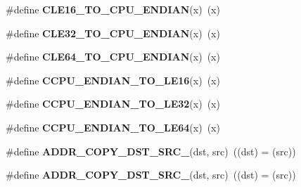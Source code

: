 \begin{DoxyCompactItemize}
\item 
\hypertarget{group__group__sam0__utils_ga4ac6e032d1ce0ae6d2e460da93ce8732}{}\#define {\bfseries C\+L\+E16\+\_\+\+T\+O\+\_\+\+C\+P\+U\+\_\+\+E\+N\+D\+I\+A\+N}(x)~(x)\label{group__group__sam0__utils_ga4ac6e032d1ce0ae6d2e460da93ce8732}

\item 
\hypertarget{group__group__sam0__utils_ga3ff07a7496222efe8bc7d7b7b0342b0d}{}\#define {\bfseries C\+L\+E32\+\_\+\+T\+O\+\_\+\+C\+P\+U\+\_\+\+E\+N\+D\+I\+A\+N}(x)~(x)\label{group__group__sam0__utils_ga3ff07a7496222efe8bc7d7b7b0342b0d}

\item 
\hypertarget{group__group__sam0__utils_gacbbba93256e2d892c748d56a42f00f9b}{}\#define {\bfseries C\+L\+E64\+\_\+\+T\+O\+\_\+\+C\+P\+U\+\_\+\+E\+N\+D\+I\+A\+N}(x)~(x)\label{group__group__sam0__utils_gacbbba93256e2d892c748d56a42f00f9b}

\item 
\hypertarget{group__group__sam0__utils_ga5fd2d3ed2fc9234277b659b67d33bc64}{}\#define {\bfseries C\+C\+P\+U\+\_\+\+E\+N\+D\+I\+A\+N\+\_\+\+T\+O\+\_\+\+L\+E16}(x)~(x)\label{group__group__sam0__utils_ga5fd2d3ed2fc9234277b659b67d33bc64}

\item 
\hypertarget{group__group__sam0__utils_ga1e3290451e5c7b98175911c9219b5123}{}\#define {\bfseries C\+C\+P\+U\+\_\+\+E\+N\+D\+I\+A\+N\+\_\+\+T\+O\+\_\+\+L\+E32}(x)~(x)\label{group__group__sam0__utils_ga1e3290451e5c7b98175911c9219b5123}

\item 
\hypertarget{group__group__sam0__utils_ga00483bf27ea1e8a2143c6baf22b31f16}{}\#define {\bfseries C\+C\+P\+U\+\_\+\+E\+N\+D\+I\+A\+N\+\_\+\+T\+O\+\_\+\+L\+E64}(x)~(x)\label{group__group__sam0__utils_ga00483bf27ea1e8a2143c6baf22b31f16}

\item 
\hypertarget{group__group__sam0__utils_gac4609178e5c825e815f44fa123dcaaf7}{}\#define {\bfseries A\+D\+D\+R\+\_\+\+C\+O\+P\+Y\+\_\+\+D\+S\+T\+\_\+\+S\+R\+C\+\_}(dst,  src)~((dst) = (src))\label{group__group__sam0__utils_gac4609178e5c825e815f44fa123dcaaf7}

\item 
\hypertarget{group__group__sam0__utils_ga0454afa80924c2183c8c672c043440cc}{}\#define {\bfseries A\+D\+D\+R\+\_\+\+C\+O\+P\+Y\+\_\+\+D\+S\+T\+\_\+\+S\+R\+C\+\_}(dst,  src)~((dst) = (src))\label{group__group__sam0__utils_ga0454afa80924c2183c8c672c043440cc}

\end{DoxyCompactItemize}

